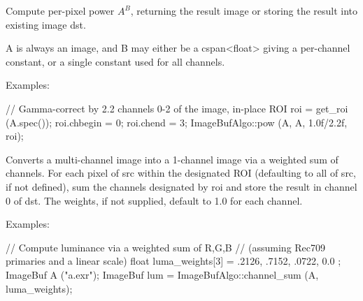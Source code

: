 Compute per-pixel power $A^B$, returning the result image
or storing the result into existing image {\cf dst}.

{\cf A} is always an image, and {\cf B} may either be
a {\cf cspan<float>} giving a per-channel constant, or a single constant
used for all channels.

\smallskip
\noindent Examples:
\begin{code}
    // Gamma-correct by 2.2 channels 0-2 of the image, in-place
    ROI roi = get_roi (A.spec());
    roi.chbegin = 0;  roi.chend = 3;
    ImageBufAlgo::pow (A, A, 1.0f/2.2f, roi);
\end{code}
\apiend


 
Converts a multi-channel image into a 1-channel image via a weighted sum
of channels.  For each pixel of {\cf src} within the designated ROI
(defaulting to all of {\cf src}, if not defined), sum the channels
designated by {\cf roi} and store the result in channel 0 of {\cf dst}.
The {\cf weights}, if not supplied, default to 1.0 for each channel.

\smallskip
\noindent Examples:
\begin{code}
    // Compute luminance via a weighted sum of R,G,B
    // (assuming Rec709 primaries and a linear scale)
    float luma_weights[3] = { .2126, .7152, .0722, 0.0 };
    ImageBuf A ("a.exr");
    ImageBuf lum = ImageBufAlgo::channel_sum (A, luma_weights);
\end{code}
\apiend


 

